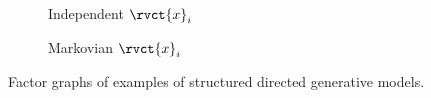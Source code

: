 \begin{figure}[!t]
\centering
\begin{subfigure}[t]{.35\linewidth}
\centering
{}
\caption{Independent $\rvct{x}_i$}\label{sfig:directed-model-independent}
\end{subfigure}%
\begin{subfigure}[t]{.62\linewidth}
\centering
{}
\caption{Markovian $\rvct{x}_i$}\label{sfig:directed-model-markov}
\end{subfigure}%
\caption[Structured directed generative models.]{Factor graphs of examples of structured directed generative models.}
\label{fig:directed-model-structure-examples}
\end{figure}

